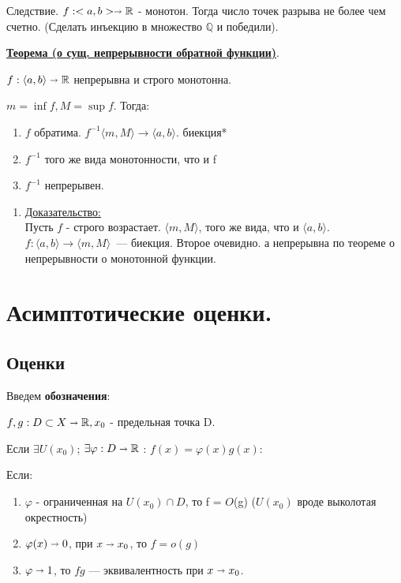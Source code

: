 \documentclass{article}
\newcommand{\thmm}[1]{\underline{\textbf{#1}}}
\newcommand{\prooff}[1]{{\underline{Доказательство:}} \\ }
\newcommand{\mytilde}{\raisebox{0.5ex}{\texttildelow}}
\begin{document}
Следствие. $f:<a,b> \shortrightarrow \mathbb{R}$ - монотон.
Тогда число точек разрыва не более чем счетно. (Сделать инъекцию в множество $\mathbb{Q}$ и победили).

\thmm{Теорема (о сущ. непрерывности обратной функции)}.

$f: \langle a,b \rangle \shortrightarrow \mathbb{R}$ непрерывна и строго монотонна.

$m = \inf f, M = \sup f$. Тогда:

\begin{enumerate}
    \item $f$ обратима. $f^{-1} \langle m,M\rangle \rightarrow \langle a,b \rangle$. биекция*
    \item $f^{-1}$ того же вида монотонности, что и f
    \item $f^{-1}$ непрерывен.
\end{enumerate}

\begin{enumerate}
    \item[] \prooff{}
    Пусть $f$ - строго возрастает. $\langle m, M\rangle $, того же вида, что и $\langle a, b \rangle $. $f: \langle a,b \rangle \rightarrow \langle m ,M \rangle $~--- биекция. Второе очевидно. а непрерывна по теореме о непрерывности о монотонной функции. 
\end{enumerate}





   
\pagebreak
\section{Асимптотические оценки.}

\subsection{Оценки}
Введем \textbf{обозначения}:


$f,g: D \subset X \shortrightarrow \mathbb{R}, x_0$ - предельная точка D.

Если $\exists U(x_0)$; $\exists \varphi: D \shortrightarrow \mathbb{R}$ : $f(x) = \varphi(x)g(x)$:

Если:
\begin{enumerate}
    \item $\varphi$ - ограниченная на $U(x_0) \cap D$, то f = $O$(g) ($U(x_0)$ вроде выколотая окрестность)
    \item $\varphi(x) \shortrightarrow 0$, при $x\shortrightarrow x_0$, то $ f = o(g)$
    \item $\varphi \shortrightarrow 1$, то $f $\mytilde$ g$ --- эквивалентность при $x \shortrightarrow x_0$.
\end{enumerate}
\end{document}
